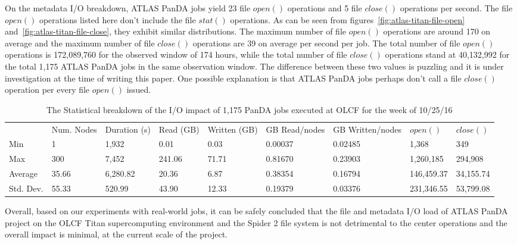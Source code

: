 On the metadata I/O breakdown, ATLAS PanDA jobs yield 23 file $open()$
operations and 5 file $close()$ operations per second. The file $open()$
operations listed here don't include the file $stat()$ operations. As can be
seen from figures~\ref{fig:atlas-titan-file-open}
and~\ref{fig:atlas-titan-file-close}, they exhibit similar distributions. The
maximum number of file $open()$ operations are around 170 on average and the
maximum number of file $close()$ operations are 39 on average per second per
job. The total number of file $open()$ operations is 172,089,760 for the
observed window of 174 hours, while the total number of file $close()$
operations stand at 40,132,992 for the total 1,175 ATLAS PanDA jobs in the same
observation window. The difference between these two values is puzzling and it
is under investigation at the time of writing this paper. One possible
explanation is that ATLAS PanDA jobs perhaps don't call a file $close()$
operation per every file $open()$ issued.



\begin{table}[t]
\centering
\begin{tabular}{lllllllll}
 & Num. Nodes & Duration (s) & Read (GB) & Written (GB) & GB Read/nodes & GB Written/nodes & $open()$ & $close()$ \\
Min & 1 & 1,932 & 0.01 & 0.03 & 0.00037 & 0.02485 & 1,368 & 349 \\
Max & 300 & 7,452 & 241.06 & 71.71 & 0.81670 & 0.23903 & 1,260,185 & 294,908 \\
Average & 35.66 & 6,280.82 & 20.36 & 6.87 & 0.38354 & 0.16794 & 146,459.37 & 34,155.74 \\
Std. Dev. & 55.33 & 520.99 & 43.90 & 12.33 & 0.19379 & 0.03376 & 231,346.55 & 53,799.08
\end{tabular}
\caption{The Statistical breakdown of the I/O impact of 1,175 PanDA jobs executed at OLCF for the week of 10/25/16}
\label{panda-olcf-stats}
\end{table}

Overall, based on our experiments with real-world jobs, it can be safely
concluded that the file and metadata I/O load of ATLAS PanDA project on the
OLCF Titan supercomputing environment and the Spider 2 file system is not
detrimental to the center operations and the overall impact is minimal, at the
current scale of the project.
